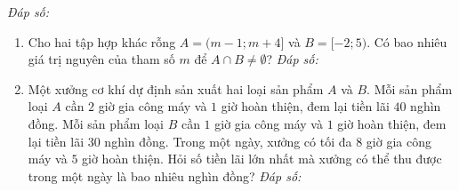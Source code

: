 \documentclass[12pt,a4paper]{article}
\newcommand{\answerbox}{\hfill\textit{Đáp số:}\ \fbox{\rule{0pt}{9pt}\hspace{2.2cm}}}
\begin{document}
\begin{enumerate}
\begin{center}
\vspace{-6pt}
\end{center}
\answerbox
\end{enumerate}
\newpage

\begin{enumerate}[resume]
\item Cho hai tập hợp khác rỗng $A = (m - 1; m + 4]$ và $B = [-2; 5)$. Có bao nhiêu giá trị nguyên của tham số $m$ để $A \cap B \ne \emptyset$?
\answerbox

\item Một xưởng cơ khí dự định sản xuất hai loại sản phẩm $A$ và $B$. Mỗi sản phẩm loại $A$ cần $2$ giờ gia công máy và $1$ giờ hoàn thiện, đem lại tiền lãi $40$ nghìn đồng. Mỗi sản phẩm loại $B$ cần $1$ giờ gia công máy và $1$ giờ hoàn thiện, đem lại tiền lãi $30$ nghìn đồng. Trong một ngày, xưởng có tối đa $8$ giờ gia công máy và $5$ giờ hoàn thiện. Hỏi số tiền lãi lớn nhất mà xưởng có thể thu được trong một ngày là bao nhiêu nghìn đồng?
\answerbox
\end{enumerate}
\end{document}
